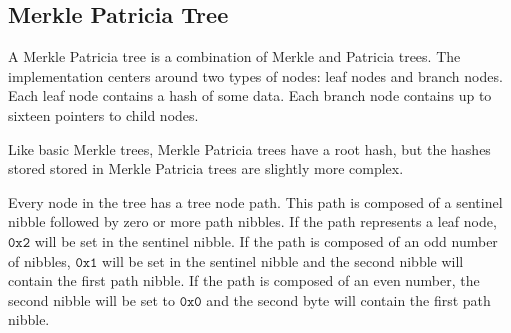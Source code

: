\begin{figure}[H]
\end{figure}

\subsection{Merkle Patricia Tree}

A Merkle Patricia tree is a combination of Merkle and Patricia trees.
The \codenamespace implementation centers around two types of nodes: leaf nodes and branch nodes.
Each leaf node contains a hash of some data.
Each branch node contains up to sixteen pointers to child nodes.

Like basic Merkle trees, Merkle Patricia trees have a root hash,
but the hashes stored stored in Merkle Patricia trees are slightly more complex.

Every node in the tree has a tree node path.
This path is composed of a sentinel nibble followed by zero or more path nibbles.
If the path represents a leaf node, $\texttt{0x2}$ will be set in the sentinel nibble.
If the path is composed of an odd number of nibbles, $\texttt{0x1}$ will be set in the sentinel nibble and the second nibble will contain the first path nibble.
If the path is composed of an even number, the second nibble will be set to $\texttt{0x0}$ and the second byte will contain the first path nibble.

